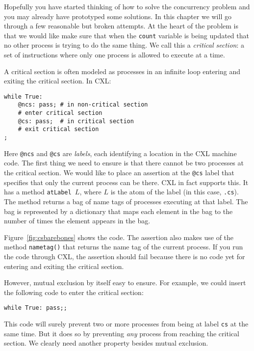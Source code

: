 \documentclass{report}
\newenvironment{code}{
\tcolorbox
}{
\endtcolorbox
}
\begin{document}
Hopefully you have started thinking of how to solve the concurrency
problem and you may already have prototyped some solutions.
In this chapter we will go through a few reasonable but broken attempts.
At the heart of the problem is that we would like make sure that when
the \texttt{count} variable is being updated that no other process is
trying to do the same thing.  We call this a \emph{critical section}: a
set of instructions where only one process is allowed to execute at a
time.

A critical section is often modeled as processes in an infinite loop
entering and exiting the critical section.  In CXL:

\begin{code}
\begin{verbatim}
while True:
    @ncs: pass; # in non-critical section
    # enter critical section
    @cs: pass;  # in critical section
    # exit critical section
;
\end{verbatim}
\end{code}

Here \texttt{@ncs} and \texttt{@cs} are \emph{labels}, each identifying
a location in the CXL machine code.  The first thing we need to
ensure is that there cannot be two processes at the critical section.
We would like to place an assertion at the \texttt{@cs} label that
specifies that only the current process can be there.  CXL in fact
supports this.  It has a method \texttt{atLabel $L$}, where $L$
is the atom of the label (in this case, \texttt{.cs}).  The
method returns a bag of name tags of processes executing at that
label.  The bag is represented by a dictionary that maps each element
in the bag to the number of times the element appears in the bag.

Figure~\ref{fig:csbarebones} shows the code.
The assertion also makes use of the method \texttt{nametag()} that
returns the name tag of the current process.
If you run the code through CXL, the assertion should fail because
there is no code yet for entering and exiting the critical section.

However, mutual exclusion by itself easy to ensure.
For example, we could insert the following code to enter the
critical section:
\begin{code}
\begin{verbatim}
while True: pass;;
\end{verbatim}
\end{code}
This code will surely prevent two or more processes from being
at label \texttt{cs} at the same time.
But it does so by preventing \emph{any} process from reaching
the critical section.
We clearly need another property besides mutual exclusion.
\end{document}
